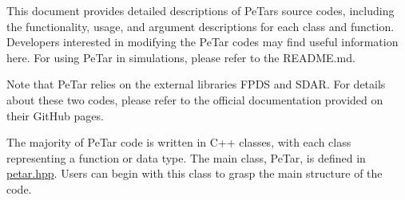 This document provides detailed descriptions of Pe\+Tar\textquotesingle{}s source codes, including the functionality, usage, and argument descriptions for each class and function. Developers interested in modifying the Pe\+Tar codes may find useful information here. For using Pe\+Tar in simulations, please refer to the R\+E\+A\+D\+M\+E.\+md.

Note that Pe\+Tar relies on the external libraries F\+P\+DS and S\+D\+AR. For details about these two codes, please refer to the official documentation provided on their Git\+Hub pages.

The majority of Pe\+Tar code is written in C++ classes, with each class representing a function or data type. The main class, Pe\+Tar, is defined in \mbox{\hyperlink{petar_8hpp}{petar.\+hpp}}. Users can begin with this class to grasp the main structure of the code. 